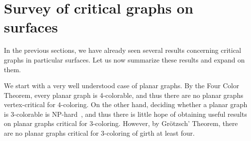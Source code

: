 \documentclass[12pt,twoside,openright,a4paper]{book}
\begin{document}
\section{Survey of critical graphs on surfaces}\label{sec:survsurf}

In the previous sections, we have already seen several results concerning critical graphs in particular surfaces.
Let us now summarize these results and expand on them.

We start with a very well understood case of planar graphs.  By the Four Color Theorem,
every planar graph is 4-colorable, and thus there are no planar graphs vertex-critical for $4$-coloring.
On the other hand, deciding whether a planar graph is $3$-colorable is NP-hard~\cite{garey1979computers},
and thus there is little hope of obtaining useful results on planar graphs critical for $3$-coloring.
However, by Gr\"{o}tzsch' Theorem, there are no planar graphs critical for $3$-coloring of girth at least four.
\end{document}
